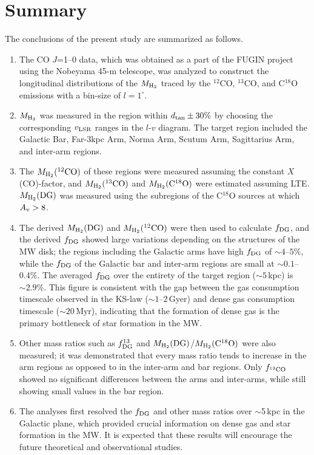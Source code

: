 \documentclass[proof]{pasj01}
\newcommand{\fDG}{f_{\rm DG}}
\newcommand{\fthree}{f_{\rm ^{13}CO}}
\newcommand{\ffDG}{f^{13}_{\rm DG}}
\newcommand{\mH}{M_{\rm H_2}}
\newcommand{\mDG}{M_{\rm H_2}{\rm (DG)}}
\newcommand{\mtwo}{M_{\rm H_2}{\rm (^{12}CO)}}
\newcommand{\mthree}{M_{\rm H_2}{\rm (^{13}CO)}}
\newcommand{\meight}{M_{\rm H_2}{\rm (C^{18}O)}}
\begin{document}
\section{Summary}
The conclusions of the present study are summarized as follows.
\begin{enumerate}
\item The CO $J$=1--0 data, which was obtained as a part of the FUGIN project using the Nobeyama 45-m telescope, was analyzed to construct the longitudinal distributions of the $\mH$ traced by the $^{12}$CO, $^{13}$CO, and C$^{18}$O emissions with a bin-size of $l = 1^\circ$. %
\item $\mH$ was measured in the region within $d_{\rm tan} \pm 30\%$ by choosing the corresponding $v_{\rm LSR}$ ranges in the $l$-$v$ diagram. The target region included the Galactic Bar, Far-3kpc Arm, Norma Arm, Scutum Arm, Sagittarius Arm, and inter-arm regions. 
\item The $\mtwo$ of these regions were measured assuming the constant $X$(CO)-factor, and $\mthree$ and $\meight$ were estimated assuming LTE.  $\mDG$ was measured using the subregions of the C$^{18}$O sources at which $A_{\rm v} > 8$.
\item The derived $\mDG$ and $\mtwo$ were then used to calculate $\fDG$, and the derived $\fDG$ showed large variations depending on the structures of the MW disk; the regions including the Galactic arms have high $\fDG$ of $\sim4$--$5\%$, while the $\fDG$ of the Galactic bar and inter-arm regions are small at $\sim0.1$--$0.4\%$. 
The averaged $\fDG$ over the entirety of the target region ($\sim5$\,kpc) is $\sim2.9\%$. This figure is consistent with the gap between the gas consumption timescale observed in the KS-law ($\sim1$--$2$\,Gyer) and dense gas consumption timescale ($\sim20$\,Myr), indicating that the formation of dense gas is the primary bottleneck of star formation in the MW.
\item Other mass ratios such as $\ffDG$ and $\mDG$/$\meight$ were also measured; it was demonstrated that every mass ratio tends to increase in the arm regions as opposed to in the inter-arm and bar regions. 
Only $\fthree$ showed no significant differences between the arms and inter-arms, while still showing small values in the bar region.
\item The analyses first resolved the $\fDG$ and other mass ratios over $\sim$5\,kpc in the Galactic plane, which provided crucial information on dense gas and star formation in the MW. It is expected that these results will encourage the future theoretical and observational studies.
\end{enumerate}
\end{document}
